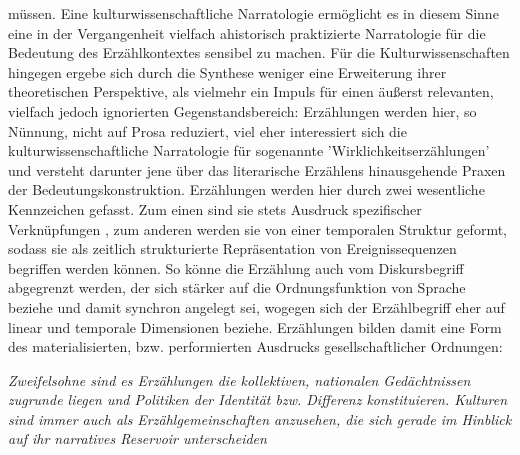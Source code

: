 müssen. Eine kulturwissenschaftliche Narratologie ermöglicht es in diesem Sinne
eine in der Vergangenheit vielfach ahistorisch praktizierte Narratologie für
die Bedeutung des Erzählkontextes sensibel zu machen. Für die
Kulturwissenschaften hingegen ergebe sich durch die Synthese weniger eine
Erweiterung ihrer theoretischen Perspektive, als vielmehr ein Impuls für einen
äußerst relevanten, vielfach jedoch ignorierten Gegenstandsbereich: Erzählungen
werden hier, so Nünnung, nicht auf Prosa reduziert, viel eher interessiert sich
die kulturwissenschaftliche Narratologie für sogenannte
'Wirklichkeitserzählungen' und versteht darunter jene über das literarische
Erzählens hinausgehende Praxen der Bedeutungskonstruktion. Erzählungen werden
hier durch zwei wesentliche Kennzeichen gefasst. Zum einen sind sie stets
Ausdruck \glqq spezifischer Verknüpfungen \grqq \footnotemark
{}, zum anderen werden sie von einer
\glqq temporalen Struktur \grqq \footnotemark {}  geformt, sodass sie als \glqq zeitlich strukturierte
Repräsentation von Ereignissequenzen\grqq \footnotemark {} begriffen werden können. So könne die
Erzählung auch vom Diskursbegriff abgegrenzt werden, der sich stärker auf die
Ordnungsfunktion von Sprache beziehe und damit synchron angelegt sei, wogegen
sich der Erzählbegriff eher auf linear und temporale Dimensionen
beziehe.\footnotemark {}
Erzählungen bilden damit eine Form des materialisierten, bzw. performierten
Ausdrucks gesellschaftlicher Ordnungen:
\begin{myenv}
  \textit{
  \glqq Zweifelsohne sind es Erzählungen die kollektiven, nationalen
  Gedächtnissen zugrunde liegen und Politiken der Identität bzw. Differenz
  konstituieren. Kulturen sind immer auch als Erzählgemeinschaften anzusehen,
  die sich gerade im Hinblick auf ihr narratives Reservoir unterscheiden \grqq
  \footnotemark {}
  } \end{myenv}

